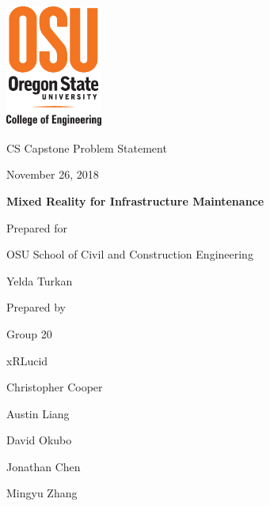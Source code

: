 \documentclass[onecolumn, draftclsnofoot,10pt, compsoc]{IEEEtran}
\def \CapstoneTeamName{		xRLucid}
\def \CapstoneTeamNumber{		20}
\def \GroupMemberOne{			Christopher Cooper}
\def \GroupMemberTwo{			Austin Liang}
\def \GroupMemberThree{			David Okubo}
\def \GroupMemberFour{			Jonathan Chen}
\def \GroupMemberFive{			Mingyu Zhang}
\def \CapstoneProjectName{		Mixed Reality for Infrastructure Maintenance}
\def \CapstoneSponsorCompany{	OSU School of Civil and Construction Engineering}
\def \CapstoneSponsorPerson{		Yelda Turkan}
\def \DocType{	Problem Statement
				}
\newcommand{\NameSigPair}[1]{\par
\makebox[2.75in][r]{#1} \hfil 	\makebox[3.25in]{\makebox[2.25in]{\hrulefill} \hfill		\makebox[.75in]{\hrulefill}}
\par\vspace{-12pt} \textit{\tiny\noindent
\makebox[2.75in]{} \hfil		\makebox[3.25in]{\makebox[2.25in][r]{Signature} \hfill	\makebox[.75in][r]{Date}}}}
\renewcommand{\NameSigPair}[1]{#1}
\begin{document}
\begin{titlepage}
    \begin{singlespace}
    	\includegraphics[height=4cm]{coe_v_spot1}
        \hfill 
        \par\vspace{.2in}
        \centering
        \scshape{
            \huge CS Capstone \DocType \par
            {\large November 26, 2018}\par
            \vspace{.5in}
            \textbf{\Huge\CapstoneProjectName}\par
            \vfill
            {\large Prepared for}\par
            \Huge \CapstoneSponsorCompany\par
            \vspace{5pt}
            {\Large\NameSigPair{\CapstoneSponsorPerson}\par}
            {\large Prepared by }\par
            Group\CapstoneTeamNumber\par
            \CapstoneTeamName\par 
            \vspace{5pt}
            {\Large
                \NameSigPair{\GroupMemberOne}\par
                \NameSigPair{\GroupMemberTwo}\par
                \NameSigPair{\GroupMemberThree}\par
                \NameSigPair{\GroupMemberFour}\par
                \NameSigPair{\GroupMemberFive}\par
            }
            \vspace{20pt}
        }


\end{singlespace}
\end{titlepage}
\end{document}
